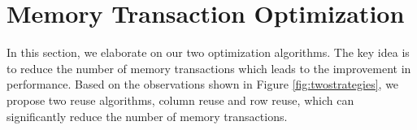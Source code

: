 \documentclass[sigplan,review,anonymous]{acmart}\settopmatter{printfolios=true,printccs=false,printacmref=false}
\begin{document}



\section{Memory Transaction Optimization}
\label{sec:strategies}
In this section, we elaborate on our two optimization algorithms. The key idea is to reduce the  number of memory transactions which leads to the improvement in performance. Based on the observations shown in Figure \ref{fig:twostrategies}, we propose two reuse algorithms, column reuse and row reuse, which can significantly reduce the number of memory transactions.
\end{document}
